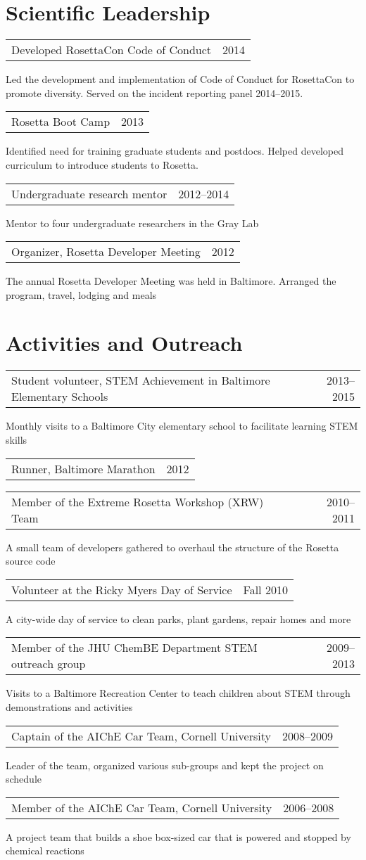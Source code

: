 \documentclass[12pt]{article}
\makeatletter
\newcommand{\allcapsspacing}[1]{{\addfontfeature{LetterSpace=7.5}#1}}
\newcommand{\leadershipitem}[3]{
\noindent
\begin{tabular*}{\textwidth}{@{\extracolsep{\fill}}lr}
		#1 & #2 \\
\end{tabular*}\newline#3\vspace{0.75\baselineskip}\par}
\makeatother
\begin{document}
\section*{\allcapsspacing{Scientific Leadership}}
\leadershipitem{Developed RosettaCon Code of Conduct}{2014}{Led the development and implementation of Code of Conduct for RosettaCon to promote diversity. Served on the incident reporting panel 2014--2015.}
\leadershipitem{Rosetta Boot Camp}{2013}{Identified need for training graduate students and postdocs. Helped developed curriculum to introduce students to Rosetta.}
\leadershipitem{Undergraduate research mentor}{2012--2014}{Mentor to four undergraduate researchers in the Gray Lab}
\leadershipitem{Organizer, Rosetta Developer Meeting}{2012}{The annual Rosetta Developer Meeting was held in Baltimore. Arranged the program, travel, lodging and meals}

\section*{\allcapsspacing{Activities and Outreach}}
\leadershipitem{Student volunteer, STEM Achievement in Baltimore Elementary Schools}{2013--2015}{Monthly visits to a Baltimore City elementary school to facilitate learning STEM skills}
\leadershipitem{Runner, Baltimore Marathon}{2012}{\vspace{-\baselineskip}}
\leadershipitem{Member of the Extreme Rosetta Workshop (XRW) Team}{2010--2011}{A small team of developers gathered to overhaul the structure of the Rosetta source code}
\leadershipitem{Volunteer at the Ricky Myers Day of Service}{Fall 2010}{A city-wide day of service to clean parks, plant gardens, repair homes and more}
\leadershipitem{Member of the JHU ChemBE Department STEM outreach group}{2009--2013}{Visits to a Baltimore Recreation Center to teach children about STEM through demonstrations and activities}
\leadershipitem{Captain of the AIChE Car Team, Cornell University}{2008--2009}{Leader of the team, organized various sub-groups and kept the project on schedule}
\leadershipitem{Member of the AIChE Car Team, Cornell University}{2006--2008}{A project team that builds a shoe box-sized car that is powered and stopped by chemical reactions}
\end{document}
